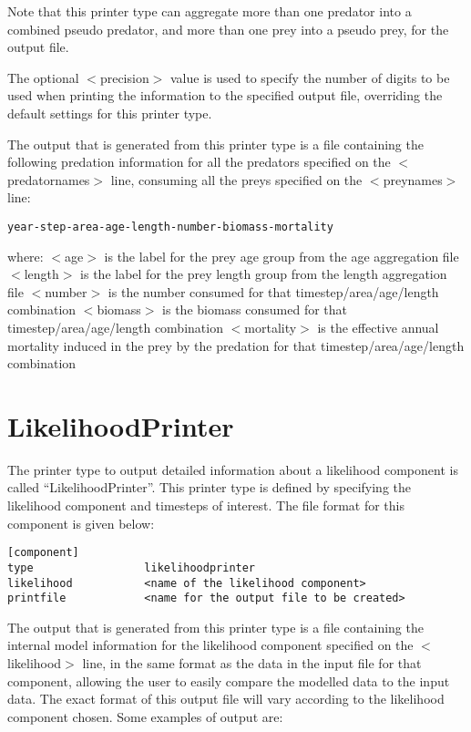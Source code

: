 \documentclass[]{book}
\begin{document}
Note that this printer type can aggregate more than one predator into a
combined pseudo predator, and more than one prey into a pseudo prey, for
the output file.

The optional \(<\)precision\(>\) value is used to specify the number of
digits to be used when printing the information to the specified output
file, overriding the default settings for this printer type.

The output that is generated from this printer type is a file containing
the following predation information for all the predators specified on
the \(<\)predatornames\(>\) line, consuming all the preys specified on the
\(<\)preynames\(>\) line:

\begin{verbatim}
year-step-area-age-length-number-biomass-mortality
\end{verbatim}

where: \(<\)age\(>\) is the label for the prey age group from the age
aggregation file \(<\)length\(>\) is the label for the prey length group
from the length aggregation file \(<\)number\(>\) is the number consumed for
that timestep/area/age/length combination \(<\)biomass\(>\) is the biomass
consumed for that timestep/area/age/length combination \(<\)mortality\(>\)
is the effective annual mortality induced in the prey by the predation
for that timestep/area/age/length combination

\hypertarget{sec:likelihoodprinter}{%
\section{LikelihoodPrinter}\label{sec:likelihoodprinter}}

The printer type to output detailed information about a likelihood
component is called ``LikelihoodPrinter''. This printer type is defined by
specifying the likelihood component and timesteps of interest. The file
format for this component is given below:

\begin{verbatim}
[component]
type                 likelihoodprinter
likelihood           <name of the likelihood component>
printfile            <name for the output file to be created>
\end{verbatim}

The output that is generated from this printer type is a file containing
the internal model information for the likelihood component specified on
the \(<\)likelihood\(>\) line, in the same format as the data in the input
file for that component, allowing the user to easily compare the
modelled data to the input data. The exact format of this output file
will vary according to the likelihood component chosen. Some examples of
output are:
\end{document}
